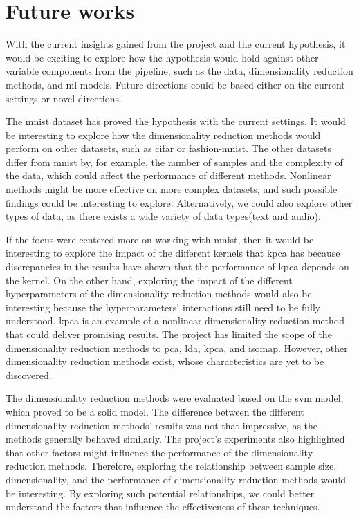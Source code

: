 \section{Future works}\label{sec:future-works}
With the current insights gained from the project and the current hypothesis, it would be exciting to explore how the hypothesis would hold against other variable components from the pipeline, such as the data, dimensionality reduction methods, and \gls{ml} models. Future directions could be based either on the current settings or novel directions.


The \gls{mnist} dataset has proved the hypothesis with the current settings. It would be interesting to explore how the dimensionality reduction methods would perform on other datasets, such as \gls{cifar} or \gls{fashion-mnist}. The other datasets differ from \gls{mnist} by, for example, the number of samples and the complexity of the data, which could affect the performance of different methods. Nonlinear methods might be more effective on more complex datasets, and such possible findings could be interesting to explore. Alternatively, we could also explore other types of data, as there exists a wide variety of data types(text and audio).


If the focus were centered more on working with \gls{mnist}, then it would be interesting to explore the impact of the different kernels that \gls{kpca} has because discrepancies in the results have shown that the performance of \gls{kpca} depends on the kernel. On the other hand, exploring the impact of the different hyperparameters of the dimensionality reduction methods would also be interesting because the hyperparameters' interactions still need to be fully understood. \gls{kpca} is an example of a nonlinear dimensionality reduction method that could deliver promising results. The project has limited the scope of the dimensionality reduction methods to \gls{pca}, \gls{lda}, \gls{kpca}, and \gls{isomap}. However, other dimensionality reduction methods exist, whose characteristics are yet to be discovered.


The dimensionality reduction methods were evaluated based on the \gls{svm} model, which proved to be a solid model. The difference between the different dimensionality reduction methods' results was not that impressive, as the methods generally behaved similarly. The project's experiments also highlighted that other factors might influence the performance of the dimensionality reduction methods. Therefore, exploring the relationship between sample size, dimensionality, and the performance of dimensionality reduction methods would be interesting. By exploring such potential relationships, we could better understand the factors that influence the effectiveness of these techniques.


